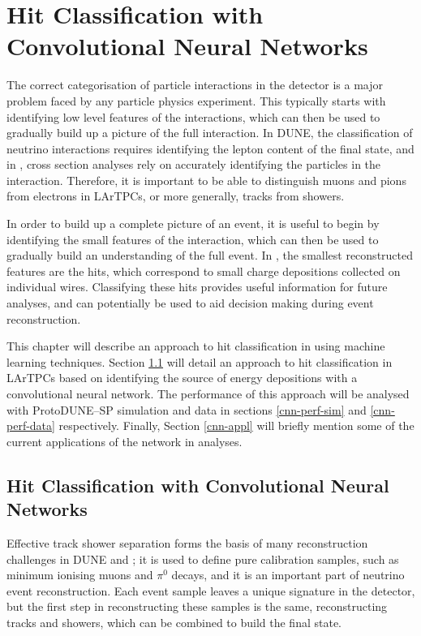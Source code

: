 \chapter{\label{ch:chargeid}Hit Classification with Convolutional Neural 
Networks} 

\minitoc

The correct categorisation of particle interactions in the detector is a major
problem faced by any particle physics experiment. This typically starts with
identifying low level features of the interactions, which can then be used to
gradually build up a picture of the full interaction. In DUNE, the
classification of neutrino interactions requires identifying the lepton content
of the final state, and in \protodune{}, cross section analyses rely on
accurately identifying the particles in the interaction. Therefore, it is
important to be able to distinguish muons and pions from electrons in LArTPCs, 
or more generally, tracks from showers.

In order to build up a complete picture of an event, it is useful to begin by
identifying the small features of the interaction, which can then be used to
gradually build an understanding of the full event. In \protodune{}, the
smallest reconstructed features are the hits, which correspond to small charge 
depositions collected on individual wires. Classifying these hits provides
useful information for future analyses, and can potentially be used to aid
decision making during event reconstruction.

This chapter will describe an approach to hit classification in \protodune{} 
using machine learning techniques. Section \ref{hit-id} will detail an 
approach to hit classification in LArTPCs based on identifying the source of 
energy depositions with a convolutional neural network.  The performance of 
this approach will be analysed with ProtoDUNE--SP simulation and data in 
sections \ref{cnn-perf-sim} and \ref{cnn-perf-data} respectively. Finally,
Section \ref{cnn-appl} will briefly mention some of the current applications of
the network in \protodune{} analyses.

\section{Hit Classification with Convolutional Neural Networks} \label{hit-id}

Effective track shower separation forms the basis of many reconstruction
challenges in DUNE and \protodune{}; it is used to define pure calibration
samples, such as minimum ionising muons and $\pi^0$ decays, and it is an
important part of neutrino event reconstruction. Each event sample leaves a
unique signature in the detector, but the first step in reconstructing these
samples is the same, reconstructing tracks and showers, which can be combined to
build the final state. 

